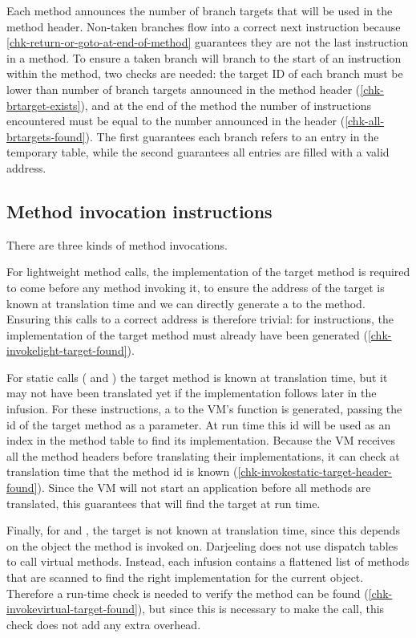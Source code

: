 Each method announces the number of branch targets that will be used in the method header. Non-taken branches flow into a correct next instruction because \ref{chk-return-or-goto-at-end-of-method} guarantees they are not the last instruction in a method. To ensure a taken branch will branch to the start of an instruction within the method, two checks are needed: the target ID of each branch must be lower than number of branch targets announced in the method header (\ref{chk-brtarget-exists}), and at the end of the method the number of  instructions encountered must be equal to the number announced in the header (\ref{chk-all-brtargets-found}). The first guarantees each branch refers to an entry in the temporary table, while the second guarantees all entries are filled with a valid address.

\subsection{Method invocation instructions}
There are three kinds of method invocations.

For lightweight method calls, the implementation of the target method is required to come before any method invoking it, to ensure the address of the target is known at translation time and we can directly generate a  to the method. Ensuring this calls to a correct address is therefore trivial: for  instructions, the implementation of the target method must already have been generated (\ref{chk-invokelight-target-found}).

For static calls ( and ) the target method is known at translation time, but it may not have been translated yet if the implementation follows later in the infusion. For these instructions, a  to the VM's  function is generated, passing the id of the target method as a parameter. At run time this id will be used as an index in the method table to find its implementation. Because the VM receives all the method headers before translating their implementations, it can check at translation time that the method id is known (\ref{chk-invokestatic-target-header-found}). Since the VM will not start an application before all methods are translated, this guarantees that  will find the target at run time.

Finally, for  and , the target is not known at translation time, since this depends on the object the method is invoked on. Darjeeling does not use dispatch tables to call virtual methods. Instead, each infusion contains a flattened list of methods that are scanned to find the right implementation for the current object. Therefore a run-time check is needed to verify the method can be found (\ref{chk-invokevirtual-target-found}), but since this is necessary to make the call, this check does not add any extra overhead.

